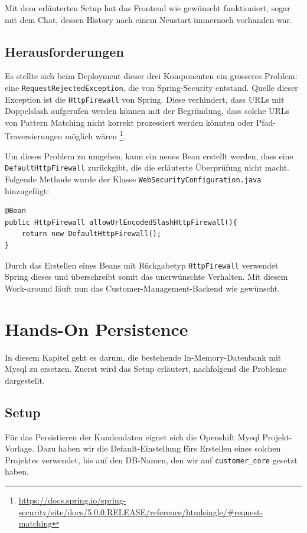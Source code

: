 \documentclass[12pt,a4paper]{article}
\begin{document}
Mit dem erläuterten Setup hat das Frontend wie gewünscht funktioniert, sogar mit dem Chat, dessen History nach einem Neustart immernoch vorhanden war. 

\subsection{Herausforderungen}\label{subsec:challenges}

Es stellte sich beim Deployment dieser drei Komponenten ein grösseres Problem: eine \texttt{RequestRejectedException}, die von Spring-Security entstand. Quelle dieser Exception ist die \texttt{HttpFirewall} von Spring. Diese verhindert, dass URLs mit Doppelslash aufgerufen werden können mit der Begründung, dass solche URLs von Pattern Matching nicht korrekt prozessiert werden könnten oder Pfad-Traversierungen möglich wären \footnote{\url{https://docs.spring.io/spring-security/site/docs/5.0.0.RELEASE/reference/htmlsingle/\#request-matching}}. 

Um dieses Problem zu umgehen, kann ein neues Bean erstellt werden, dass eine \texttt{DefaultHttpFirewall} zurückgibt, die die erläuterte Überprüfung nicht macht. Folgende Methode wurde der Klasse \texttt{Web\-Security\-Configuration.java} hinzugefügt:

\begin{lstlisting}
@Bean
public HttpFirewall allowUrlEncodedSlashHttpFirewall(){
	return new DefaultHttpFirewall();
}
\end{lstlisting}
Durch das Erstellen eines Beans mit Rückgabetyp \texttt{HttpFirewall} verwendet Spring dieses und überschreibt somit das unerwünschte Verhalten. Mit diesem Work-around läuft nun das Customer-Management-Backend wie gewünscht.

\section{Hands-On Persistence}
In diesem Kapitel geht es darum, die bestehende In-Memory-Datenbank mit Mysql zu ersetzen. Zuerst wird das Setup erläutert, nachfolgend die Probleme dargestellt. 

\subsection{Setup}

Für das Persistieren der Kundendaten eignet sich die Openshift Mysql Projekt-Vorlage. Dazu haben wir die Default-Einstellung fürs Erstellen eines solchen Projektes verwendet, bis auf den DB-Namen, den wir auf \texttt{customer\_core} gesetzt haben. 
\end{document}
